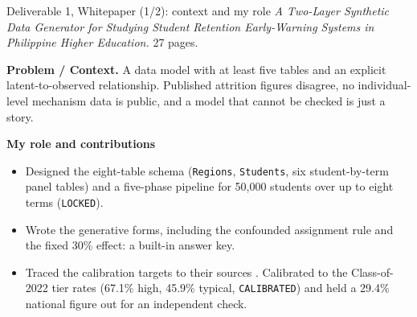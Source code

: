 \documentclass[aspectratio=169,11pt,t]{beamer}
\newcommand{\ptag}[1]{\texttt{\small #1}}
\newcommand{\pfield}[1]{{\sffamily\bfseries\color{eskteal}#1}}
\begin{document}
\begin{frame}{Deliverable 1, Whitepaper (1/2): context and my role}
  \footnotesize
  {\itshape A Two-Layer Synthetic Data Generator for Studying Student Retention
  Early-Warning Systems in Philippine Higher Education.} 27 pages.
  \smallskip

  \pfield{Problem / Context.} A data model with at least five tables and an explicit
  latent-to-observed relationship. Published attrition figures disagree, no
  individual-level mechanism data is public, and a model that cannot be checked is
  just a story.
  \vspace{1pt}

  \pfield{My role and contributions}
  \begin{itemize}\setlength\itemsep{1pt}
    \item Designed the eight-table schema (\texttt{Regions}, \texttt{Students}, six
          student-by-term panel tables) and a five-phase pipeline for 50,000
          students over up to eight terms (\ptag{LOCKED}).
    \item Wrote the generative forms, including the confounded assignment rule and
          the fixed 30\% effect: a built-in answer key.
    \item Traced the calibration targets to their sources
          \citep{cpbrd2026,edcom2025y2,ched2025presentation,pids2024}. Calibrated
          to the Class-of-2022 tier rates (67.1\% high, 45.9\% typical,
          \ptag{CALIBRATED}) and held a 29.4\% national figure out for an
          independent check.
  \end{itemize}
\end{frame}
\end{document}
